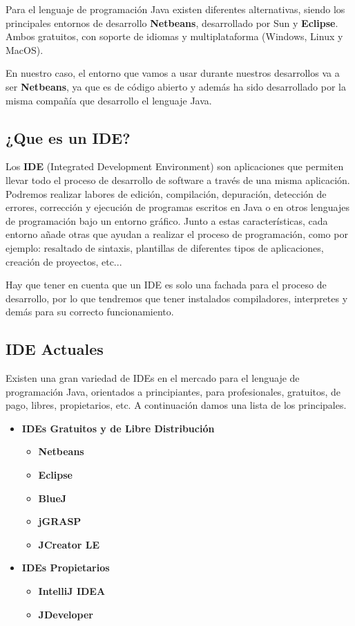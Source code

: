 Para el lenguaje de programación Java existen diferentes alternativas, siendo los principales entornos de desarrollo \textbf{Netbeans}, desarrollado por Sun y \textbf{Eclipse}. Ambos gratuitos, con soporte de idiomas y multiplataforma (Windows, Linux y MacOS).

En nuestro caso, el entorno que vamos a usar durante nuestros desarrollos va a ser \textbf{Netbeans}, ya que es de código abierto y además ha sido desarrollado por la misma compañía que desarrollo el lenguaje Java.

\subsection{¿Que es un IDE?}
Los \textbf{IDE} (Integrated Development Environment) son aplicaciones que permiten llevar todo el proceso de desarrollo de software a través de una misma aplicación. Podremos realizar labores de edición, compilación, depuración, detección de errores, corrección y ejecución de programas escritos en Java o en otros lenguajes de programación bajo un entorno gráfico. Junto a estas características, cada entorno añade otras que ayudan a realizar el proceso de programación, como por ejemplo: resaltado de sintaxis, plantillas de diferentes tipos de aplicaciones, creación de proyectos, etc...

Hay que tener en cuenta que un IDE es solo una fachada para el proceso de desarrollo, por lo que tendremos que tener instalados compiladores, interpretes y demás para su correcto funcionamiento.

\subsection{IDE Actuales}
Existen una gran variedad de IDEs en el mercado para el lenguaje de programación Java, orientados a principiantes, para profesionales, gratuitos, de pago, libres, propietarios, etc. A continuación damos una lista de los principales.

\begin{itemize}
    \item \textbf{IDEs Gratuitos y de Libre Distribución}
    \begin{itemize}
        \item \textbf{Netbeans}
        \item \textbf{Eclipse}
        \item \textbf{BlueJ}
        \item \textbf{jGRASP}
        \item \textbf{JCreator LE}
    \end{itemize}

    \item \textbf{IDEs Propietarios}
    \begin{itemize}
        \item \textbf{IntelliJ IDEA}
        \item \textbf{JDeveloper}
    \end{itemize}
\end{itemize}

